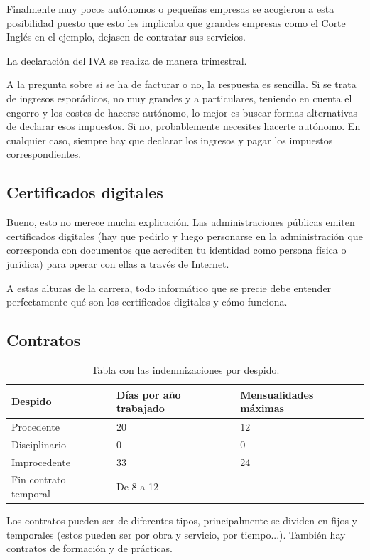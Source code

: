\documentclass[nochap,palatino,shortheader]{apuntes}
\begin{document}
Finalmente muy pocos autónomos o pequeñas empresas se acogieron a esta posibilidad puesto que esto les implicaba que grandes empresas como el Corte Inglés en el ejemplo, dejasen de contratar sus servicios.

\obs La declaración del IVA se realiza de manera trimestral.

A la pregunta sobre si se ha de facturar o no, la respuesta es sencilla. Si se trata de ingresos esporádicos, no muy grandes y a particulares, teniendo en cuenta el engorro y los costes de hacerse autónomo, lo mejor es buscar formas alternativas de declarar esos impuestos. Si no, probablemente necesites hacerte autónomo. En cualquier caso, siempre hay que declarar los ingresos y pagar los impuestos correspondientes.

\subsection{Certificados digitales}

Bueno, esto no merece mucha explicación. Las administraciones públicas emiten certificados digitales (hay que pedirlo y luego personarse en la administración que corresponda con documentos que acrediten tu identidad como persona física o jurídica) para operar con ellas a través de Internet.

A estas alturas de la carrera, todo informático que se precie debe entender perfectamente qué son los certificados digitales y cómo funciona.

\subsection{Contratos}

\begin{table}[hbtp]
\centering
\begin{tabular}{l|l|l}
\textbf{Despido} & \textbf{Días por año trabajado} & \textbf{Mensualidades máximas} \\ \toprule
Procedente & 20 & 12 \\
Disciplinario & 0 & 0 \\
Improcedente & 33 & 24 \\
Fin contrato temporal & De 8 a 12 & - \\
\end{tabular}
\caption{Tabla con las indemnizaciones por despido.}
\label{tab:Despido}
\end{table}

Los contratos pueden ser de diferentes tipos, principalmente se dividen en fijos y temporales (estos pueden ser por obra y servicio, por tiempo...). También hay contratos de formación y de prácticas.
\end{document}
